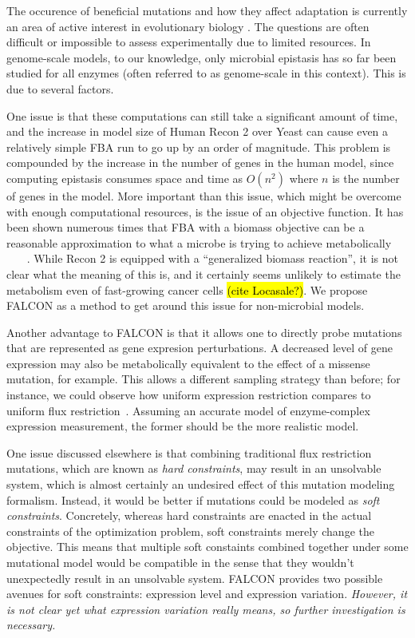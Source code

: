 \documentclass[phd,tocprelim]{cornell}
\theoremstyle{break}
\theoremstyle{empty}
\begin{document}
The occurence of beneficial mutations and how they affect adaptation
is currently an area of active interest in evolutionary biology
\cite{Chou2011} \cite{Weinreich2006}. The questions are often
difficult or impossible to assess experimentally due to limited
resources.  In genome-scale models, to our knowledge, only microbial
epistasis has so far been studied for all enzymes (often referred to
as genome-scale in this context). This is due to several factors.

One issue is that these computations can still take a significant
amount of time, and the increase in model size of Human Recon 2 over
Yeast can cause even a relatively simple FBA run to go up by an order
of magnitude.  This problem is compounded by the increase in the
number of genes in the human model, since computing epistasis consumes
space and time as $O(n^2)$ where $n$ is the number of genes in the
model. More important than this issue, which might be overcome with
enough computational resources, is the issue of an objective
function. It has been shown numerous times that FBA with a biomass
objective can be a reasonable approximation to what a microbe is
trying to achieve metabolically
~\cite{Schuetz2012}~\cite{Fong2004}~\cite{Varma1994} . While Recon 2
is equipped with a ``generalized biomass reaction'', it is not clear
what the meaning of this is, and it certainly seems unlikely to
estimate the metabolism even of fast-growing cancer cells \hl{(cite
  Locasale?)}. We propose FALCON as a method to get around this issue
for non-microbial models.

Another advantage to FALCON is that it allows one to directly probe
mutations that are represented as gene expresion perturbations. A
decreased level of gene expression may also be metabolically
equivalent to the effect of a missense mutation, for example. This
allows a different sampling strategy than before; for instance, we
could observe how uniform expression restriction compares to uniform
flux restriction~\cite{Xu2012}. Assuming an accurate model of
enzyme-complex expression measurement, the former should be the more
realistic model.

One issue discussed elsewhere is that combining traditional flux
restriction mutations, which are known as \emph{hard constraints}, may
result in an unsolvable system, which is almost certainly an undesired
effect of this mutation modeling formalism. Instead, it would be
better if mutations could be modeled as \emph{soft
  constraints}. Concretely, whereas hard constraints are enacted in
the actual constraints of the optimization problem, soft constraints
merely change the objective. This means that multiple soft constaints
combined together under some mutational model would be compatible in
the sense that they wouldn't unexpectedly result in an unsolvable
system. FALCON provides two possible avenues for soft constraints:
expression level and expression variation. \emph{However, it is not
  clear yet what expression variation really means, so further
  investigation is necessary.}
\end{document}
